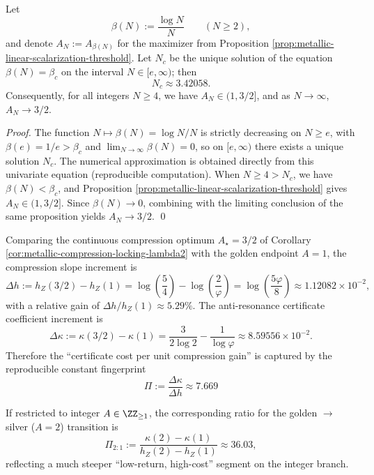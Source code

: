 \begin{corollary}\label{cor:metallic-sample-threshold}
Let
\[
\beta(N):=\frac{\log N}{N}\qquad(N\ge 2),
\]
and denote \(A_N:=A_{\beta(N)}\) for the maximizer from Proposition \ref{prop:metallic-linear-scalarization-threshold}.
Let \(N_c\) be the unique solution of the equation \(\beta(N)=\beta_c\) on the interval \(N\in[e,\infty)\); then
\[
N_c\approx 3.42058.
\]
Consequently, for all integers \(N\ge 4\), we have \(A_N\in(1,3/2]\), and as \(N\to\infty\), \(A_N\to 3/2\).
\end{corollary}
\begin{proof}
The function \(N\mapsto \beta(N)=\log N/N\) is strictly decreasing on \(N\ge e\), with \(\beta(e)=1/e>\beta_c\) and \(\lim_{N\to\infty}\beta(N)=0\), so on \([e,\infty)\) there exists a unique solution \(N_c\).
The numerical approximation is obtained directly from this univariate equation (reproducible computation).
When \(N\ge 4>N_c\), we have \(\beta(N)<\beta_c\), and Proposition \ref{prop:metallic-linear-scalarization-threshold} gives \(A_N\in(1,3/2]\).
Since \(\beta(N)\to 0\), combining with the limiting conclusion of the same proposition yields \(A_N\to 3/2\). \qed
\end{proof}

\begin{remark}\label{rem:metallic-marginal-price}
Comparing the continuous compression optimum \(A_\star=3/2\) of Corollary \ref{cor:metallic-compression-locking-lambda2} with the golden endpoint \(A=1\),
the compression slope increment is
\[
\Delta h:=h_Z(3/2)-h_Z(1)
=\log\!\left(\frac{5}{4}\right)-\log\!\left(\frac{2}{\varphi}\right)
=\log\!\left(\frac{5\varphi}{8}\right)\approx 1.12082\times 10^{-2},
\]
with a relative gain of \(\Delta h/h_Z(1)\approx 5.29\%\).
The anti-resonance certificate coefficient increment is
\[
\Delta \kappa:=\kappa(3/2)-\kappa(1)
=\frac{3}{2\log 2}-\frac{1}{\log\varphi}\approx 8.59556\times 10^{-2}.
\]
Therefore the ``certificate cost per unit compression gain'' is captured by the reproducible constant fingerprint
\[
\boxed{\ \Pi:=\frac{\Delta \kappa}{\Delta h}\approx 7.669\ }
\]
\par
If restricted to integer \(A\in\ZZ_{\ge 1}\), the corresponding ratio for the golden \(\to\) silver (\(A=2\)) transition is
\[
\Pi_{2:1}:=\frac{\kappa(2)-\kappa(1)}{h_Z(2)-h_Z(1)}\approx 36.03,
\]
reflecting a much steeper ``low-return, high-cost'' segment on the integer branch.
\end{remark}

